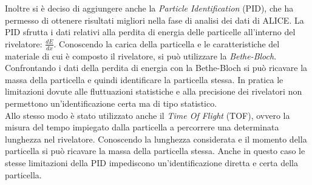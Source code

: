     
    
    
    
    Inoltre si è deciso di aggiungere anche la \textit{Particle Identification} (PID), che ha permesso di ottenere risultati migliori nella fase di analisi dei dati di ALICE. La PID sfrutta i dati relativi alla perdita di energia delle particelle all'interno del rivelatore: $\frac{dE}{dx}$. Conoscendo la carica della particella e le caratteristiche del materiale di cui è composto il rivelatore, si può utilizzare la \textit{Bethe-Bloch}. Confrontando i dati della perdita di energia con la Bethe-Bloch si può ricavare la massa della particella e quindi identificare la particella stessa. In pratica le limitazioni dovute alle fluttuazioni statistiche e alla precisione dei rivelatori non permettono un'identificazione certa ma di tipo statistico. 
    \\Allo stesso modo è stato utilizzato anche il \textit{Time Of Flight} (TOF), ovvero la misura del tempo impiegato dalla particella a percorrere una determinata lunghezza nel rivelatore. Conoscendo la lunghezza considerata e il momento della particella si può ricavare la massa della particella stessa. Anche in questo caso le stesse limitazioni della PID impediscono un'identificazione diretta e certa della particella. 
    
